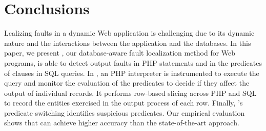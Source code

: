 \section{Conclusions}


Lcalizing faults in a dynamic Web application is challenging due to
its dynamic nature and the interactions between the application and
the databases. In this paper, we present {\tool}, our database-aware
fault localization method for Web programs, is able to detect output
faults in PHP statements and in the predicates of  clauses
in SQL queries. In {\tool}, an PHP interpreter is instrumented to
execute the query and monitor the evaluation of the predicates to
decide if they affect the output of individual records. It performs
row-based slicing across PHP and SQL to record the entities exercised
in the output process of each row. Finally, {\tool}'s predicate
switching identifies suspicious predicates. Our empirical evaluation
shows that {\tool} can achieve higher accuracy than the
state-of-the-art approach.



